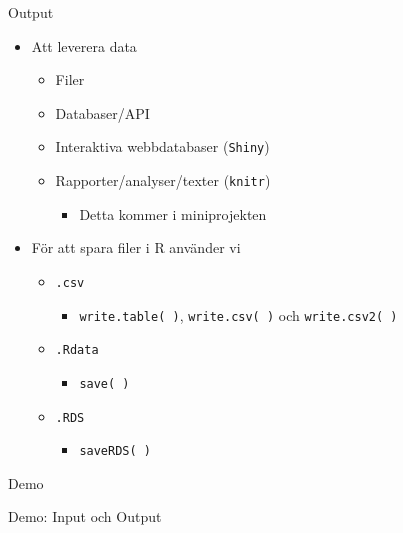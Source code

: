 \documentclass[
  11pt,
  ignorenonframetext,
]{beamer}
\providecommand{\tightlist}{%
  \setlength{\itemsep}{0pt}\setlength{\parskip}{0pt}}
\begin{document}
\begin{frame}{Output}
\label{output}
\begin{itemize}
\tightlist
\item
  Att leverera data

  \begin{itemize}
  \tightlist
  \item
    Filer
  \item
    Databaser/API
  \item
    Interaktiva webbdatabaser (\texttt{Shiny})
  \item
    Rapporter/analyser/texter (\texttt{knitr})

    \begin{itemize}
    \tightlist
    \item
      Detta kommer i miniprojekten
    \end{itemize}
  \end{itemize}
\end{itemize}

\pause

\begin{itemize}
\tightlist
\item
  För att spara filer i R använder vi

  \begin{itemize}
  \tightlist
  \item
    \texttt{.csv}

    \begin{itemize}
    \tightlist
    \item
      \texttt{write.table( )}, \texttt{write.csv( )} och
      \texttt{write.csv2( )}
    \end{itemize}
  \item
    \texttt{.Rdata}

    \begin{itemize}
    \tightlist
    \item
      \texttt{save( )}
    \end{itemize}
  \item
    \texttt{.RDS}

    \begin{itemize}
    \tightlist
    \item
      \texttt{saveRDS( )}
    \end{itemize}
  \end{itemize}
\end{itemize}
\end{frame}

\begin{frame}{Demo}
\label{demo-4}
\begin{block}{Demo: Input och Output}
\label{demo-input-och-output}
\end{block}
\end{frame}
\end{document}
